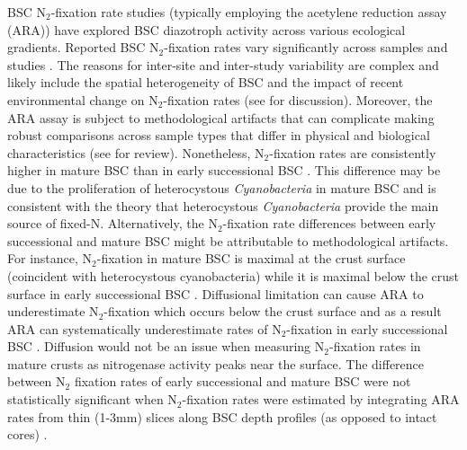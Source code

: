 BSC N$_{2}$-fixation rate studies (typically employing the acetylene reduction
assay (ARA)) have explored BSC diazotroph activity across various ecological
gradients. Reported BSC N$_{2}$-fixation rates vary significantly across
samples and studies \citep{Evans_2001}.  The reasons for inter-site and
inter-study variability are complex and likely include the spatial
heterogeneity of BSC \citep{Evans_2001} and the impact of recent environmental
change on N$_{2}$-fixation rates (see \citet{Belnap_2001} for discussion).
Moreover, the ARA assay is subject to methodological artifacts that can
complicate making robust comparisons across sample types that differ in
physical and biological characteristics (see \citet{Belnap_2001} for review).
Nonetheless, N$_{2}$-fixation rates are consistently higher in mature BSC than
in early successional BSC \citep{Belnap_2002, 14766579}. This difference
may be due to the proliferation of heterocystous \textit{Cyanobacteria} in
mature BSC and is consistent with the theory that heterocystous
\textit{Cyanobacteria} provide the main source of fixed-N.
Alternatively, the N$_{2}$-fixation rate differences between early
successional and mature BSC might be attributable to methodological artifacts.
For instance, N$_{2}$-fixation in mature BSC is maximal at the crust surface
(coincident with heterocystous cyanobacteria) while it is maximal below the
crust surface in early successional BSC \citep{15643930}. Diffusional
limitation can cause ARA to underestimate N$_{2}$-fixation which
occurs below the crust surface and as a result ARA can systematically
underestimate rates of N$_{2}$-fixation in early successional BSC
\citep{15643930}. Diffusion would not be an issue when measuring
N$_{2}$-fixation rates in mature crusts as nitrogenase activity peaks near the
surface.  The difference between N$_{2}$ fixation rates of early
successional and mature BSC were not statistically significant when
N$_{2}$-fixation rates were estimated by integrating ARA rates from
thin (1-3mm) slices along BSC depth profiles (as opposed to 
intact cores) \citep{15643930}.

